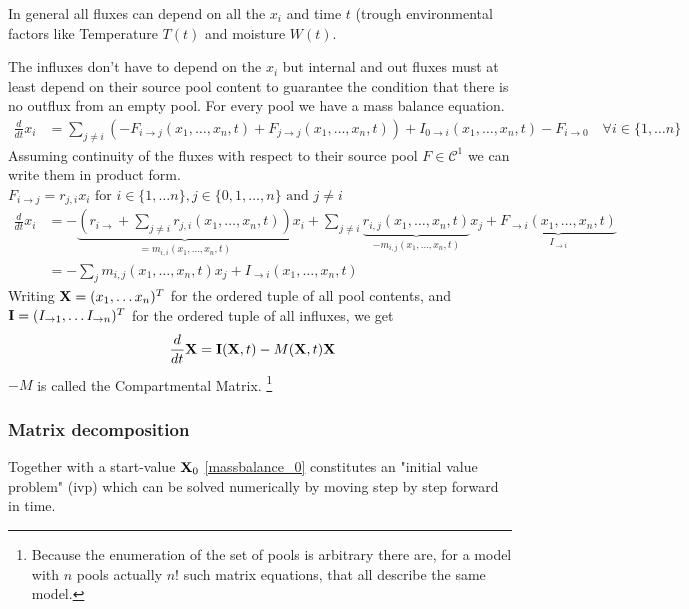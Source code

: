 In general all fluxes can depend on all the $x_i$  and time $t$ (trough environmental factors like  Temperature $T(t)$ and moisture $W(t)$.

The influxes don't have to depend on the $x_i$  but internal and out fluxes must at least depend on their source pool content to guarantee the 
condition that there is no outflux from an empty pool. 
\newcommand{\xnt}{(x_1, \dots, x_n, t)}
For every pool we have a mass balance equation.
\begin{align}
  \frac{d}{d t} x_i 
    &= 
    \sum_{j\ne i} (-F_{i\rightarrow j}\xnt
    +F_{j\rightarrow j}\xnt ) 
    + I_{0 \rightarrow i}\xnt 
    - F_{i \rightarrow 0} \quad \forall i \in \{1,\dots n\}
\end{align}
Assuming continuity of the fluxes with respect to their source pool 
$F \in \mathcal C^1$ we can write them in product form. 
$F_{i \rightarrow j} = r_{j,i} x_i \text{ for } i \in \{1, \dots n\} , j \in \{ 0, 1,\dots ,n\} \text{ and } j \ne i $ 
\begin{align}
  \frac{d}{d t} x_i 
    &= - \underbrace{
      \left(
      r_{i \rightarrow } 
      + 
      \sum_{j \ne i} r_{j,i}\xnt
      \right)
      }_{=m_{i,i}\xnt}
      x_i
      +
      \sum_{j \ne i} \underbrace{r_{i,j}\xnt}_{- m_{i,j} \xnt } x_j
      +
      \underbrace{F_{\rightarrow i}\xnt}_{I_{\rightarrow i}}
    \\
    &= 
      -\sum_{j} m_{i,j}\xnt x_j + I_{\rightarrow i}\xnt
\end{align}
Writing 
$\mathbf{X}=(x_1,\dots x_n)^T$ for the ordered tuple of all pool contents, and $\mathbf{I}=(I_{\rightarrow 1},\dots I_{\rightarrow n})^T$ for the ordered tuple of all influxes, we get
\begin{align}
  \frac{d}{d t} \mathbf{X} &= \mathbf{I}(\mathbf{X},t) - M(\mathbf{X},t) \mathbf{X} \label{massbalance_0}
\end{align}
$-M$ is called the Compartmental Matrix. \footnote{Because the enumeration of the set of pools is arbitrary there are, for a model with $n$ pools actually $n!$ such matrix equations, that all describe the same model.}  

\subsubsection{Matrix decomposition} 
Together with a start-value $\mathbf{X}_0$ \eqref{massbalance_0}  constitutes an "initial value problem" (ivp) which can be solved numerically by moving step by step forward in time.


